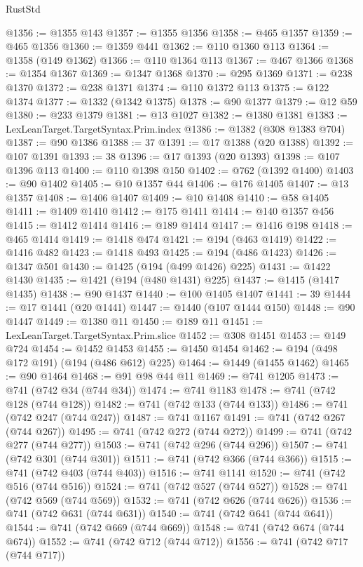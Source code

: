 \begin{lexlean}{RustStd}
\begin{coremodule}
{\begin{coremodule}
{{{{{{{{{{{{{{{{{{{{{{{{{{{{{{{{{{{{{{{{{{{{{@1356 := @1355 @143
@1357 := @1355 @1356
@1358 := @465 @1357
@1359 := @465 @1356
@1360 := @1359 @441
@1362 := @110 @1360 @113
@1364 := @1358 (@149 @1362)
@1366 := @110 @1364 @113
@1367 := @467 @1366
@1368 := @1354 @1367
@1369 := @1347 @1368
@1370 := @295 @1369
@1371 := @238 @1370
@1372 := @238 @1371
@1374 := @110 @1372 @113
@1375 := @122 @1374
@1377 := @1332 (@1342 @1375)
@1378 := @90 @1377
@1379 := @12 @59
@1380 := @233 @1379
@1381 := @13 @1027
@1382 := @1380 @1381
@1383 := LexLeanTarget.TargetSyntax.Prim.index
@1386 := @1382 (@308 @1383 @704)
@1387 := @90 @1386
@1388 := 37
@1391 := @17 @1388 (@20 @1388)
@1392 := @107 @1391
@1393 := 38
@1396 := @17 @1393 (@20 @1393)
@1398 := @107 @1396 @113
@1400 := @110 @1398 @150
@1402 := @762 (@1392 @1400)
@1403 := @90 @1402
@1405 := @10 @1357 @44
@1406 := @176 @1405
@1407 := @13 @1357
@1408 := @1406 @1407
@1409 := @10 @1408
@1410 := @58 @1405
@1411 := @1409 @1410
@1412 := @175 @1411
@1414 := @140 @1357 @456
@1415 := @1412 @1414
@1416 := @189 @1414
@1417 := @1416 @198
@1418 := @465 @1414
@1419 := @1418 @474
@1421 := @194 (@463 @1419)
@1422 := @1416 @482
@1423 := @1418 @493
@1425 := @194 (@486 @1423)
@1426 := @1347 @501
@1430 := @1425 (@194 (@499 @1426) @225)
@1431 := @1422 @1430
@1435 := @1421 (@194 (@480 @1431) @225)
@1437 := @1415 (@1417 @1435)
@1438 := @90 @1437
@1440 := @100 @1405 @1407
@1441 := 39
@1444 := @17 @1441 (@20 @1441)
@1447 := @1440 (@107 @1444 @150)
@1448 := @90 @1447
@1449 := @1380 @11
@1450 := @189 @11
@1451 := LexLeanTarget.TargetSyntax.Prim.slice
@1452 := @308 @1451
@1453 := @149 @724
@1454 := @1452 @1453
@1455 := @1450 @1454
@1462 := @194 (@498 @172 @191) (@194 (@486 @612) @225)
@1464 := @1449 (@1455 @1462)
@1465 := @90 @1464
@1468 := @91 @98 @44 @11
@1469 := @741 @1205
@1473 := @741 (@742 @34 (@744 @34))
@1474 := @741 @1183
@1478 := @741 (@742 @128 (@744 @128))
@1482 := @741 (@742 @133 (@744 @133))
@1486 := @741 (@742 @247 (@744 @247))
@1487 := @741 @1167
@1491 := @741 (@742 @267 (@744 @267))
@1495 := @741 (@742 @272 (@744 @272))
@1499 := @741 (@742 @277 (@744 @277))
@1503 := @741 (@742 @296 (@744 @296))
@1507 := @741 (@742 @301 (@744 @301))
@1511 := @741 (@742 @366 (@744 @366))
@1515 := @741 (@742 @403 (@744 @403))
@1516 := @741 @1141
@1520 := @741 (@742 @516 (@744 @516))
@1524 := @741 (@742 @527 (@744 @527))
@1528 := @741 (@742 @569 (@744 @569))
@1532 := @741 (@742 @626 (@744 @626))
@1536 := @741 (@742 @631 (@744 @631))
@1540 := @741 (@742 @641 (@744 @641))
@1544 := @741 (@742 @669 (@744 @669))
@1548 := @741 (@742 @674 (@744 @674))
@1552 := @741 (@742 @712 (@744 @712))
@1556 := @741 (@742 @717 (@744 @717))
}}}}}}}}}}}}}}}}}}}}}}}}}}}}}}}}}}}}}}}}}}}}}
\end{coremodule}}
\end{coremodule}
\end{lexlean}
